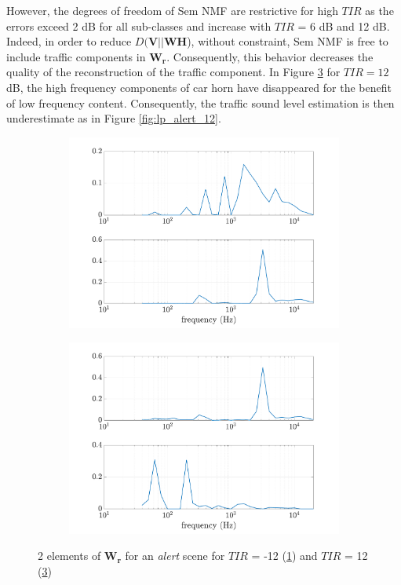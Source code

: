 \documentclass[twocolumn,a4paper,10pt]{article}
\begin{document}
However, the degrees of freedom of Sem NMF are restrictive for high $TIR$ as the errors exceed 2 dB for all sub-classes and increase with $TIR$ = 6 dB and 12 dB. Indeed, in order to reduce $D(\mathbf{V} \vert \vert \mathbf{WH}$), without constraint, Sem NMF is free to include traffic components in $\mathbf{W_r}$. Consequently, this behavior decreases the quality of the reconstruction of the traffic component. In Figure \ref{fig:Y_alert_12} for $TIR=12$ dB, the high frequency components of car horn have disappeared for the benefit of low frequency content. Consequently, the traffic sound level estimation is then underestimate as in Figure \ref{fig:lp_alert_12}. \\

\begin{figure}
    \centering
    \begin{subfigure}[t]{0.45\textwidth}
        \centering
        \includegraphics[width=\linewidth]{figures/Y_alert_-12.pdf}
        \caption{}
        \label{fig:Y_alert-12}
    \end{subfigure}%
    \hfill
    \begin{subfigure}[t]{0.45\textwidth}
        \centering
        \includegraphics[width=\linewidth]{figures/Y_alert_12.pdf}
        \caption{}
		\label{fig:Y_alert_12}
    \end{subfigure}
    \caption{2 elements of $\mathbf{W_r}$ for an \textit{alert} scene for $TIR$ = -12 (\ref{fig:Y_alert-12}) and $TIR$ = 12 (\ref{fig:Y_alert_12})}
\end{figure}
\end{document}
